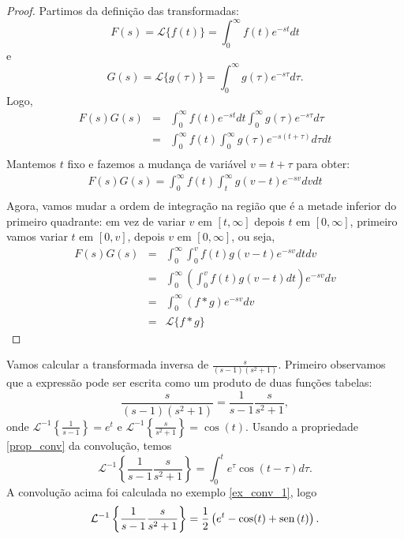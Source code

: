\begin{proof}Partimos da definição das transformadas:
\begin{equation}
F(s)=\mathcal{L}\{f(t) \}=\int_0^\infty f(t)e^{-st}dt
\end{equation}
e
\begin{equation}
G(s)=\mathcal{L}\{g(\tau) \}=\int_0^\infty g(\tau)e^{-s\tau}d\tau.
\end{equation}
Logo,
\begin{eqnarray*}
 F(s)G(s)&=&\int_0^\infty f(t)e^{-st}dt\int_0^\infty g(\tau)e^{-s\tau}d\tau\\
&=&\int_0^\infty f(t) \int_0^\infty g(\tau)e^{-s(t+\tau)} d\tau dt\\
\end{eqnarray*}
Mantemos $t$ fixo e fazemos a mudança de variável $v=t+\tau$ para obter:
\begin{eqnarray*}
 F(s)G(s)=\int_0^\infty f(t) \int_t^\infty g(v-t)e^{-sv}dv dt\\
\end{eqnarray*}
Agora, vamos mudar a ordem de integração na região que é a metade inferior do primeiro quadrante: em vez de variar $v$ em $[t,\infty]$ depois $t$ em $[0,\infty]$, primeiro vamos variar $t$ em $[0,v]$, depois $v$ em $[0,\infty]$, ou seja,
\begin{eqnarray*}
 F(s)G(s)&=&\int_0^\infty  \int_0^v f(t) g(v-t)e^{-sv} dt dv\\
 &=&\int_0^\infty \left( \int_0^v f(t) g(v-t)dt\right)e^{-sv}  dv\\
 &=&\int_0^\infty (f*g)e^{-sv}  dv\\
   &=&\mathcal{L}\{f*g\}
\end{eqnarray*}
\end{proof}
\begin{ex}Vamos calcular a transformada inversa de $\frac{s}{(s-1)(s^2+1)}$. Primeiro observamos que a expressão pode ser escrita como um produto de duas funções tabelas:
\begin{equation}
\frac{s}{(s-1)(s^2+1)}=\frac{1}{s-1}\frac{s}{s^2+1},
\end{equation}
 onde $\mathcal{L}^{-1}\left\{\frac{1}{s-1}\right\}=e^t$ e $\mathcal{L}^{-1}\left\{\frac{s}{s^2+1}\right\}=\cos(t)$. Usando a propriedade \ref{prop_conv} da convolução, temos
 \begin{equation}
 \mathcal{L}^{-1}\left\{\frac{1}{s-1}\frac{s}{s^2+1}\right\}=\int_0^t e^\tau \cos(t-\tau)d\tau.
 \end{equation}
 A convolução acima foi calculada no exemplo \ref{ex_conv_1}, logo
\begin{equation}
 \mathcal{L}^{-1}\left\{\frac{1}{s-1}\frac{s}{s^2+1}\right\}= \frac{1}{2}\left(e^t-\cos(t)+\operatorname{sen}\,(t)  \right).
 \end{equation}
 \end{ex}
